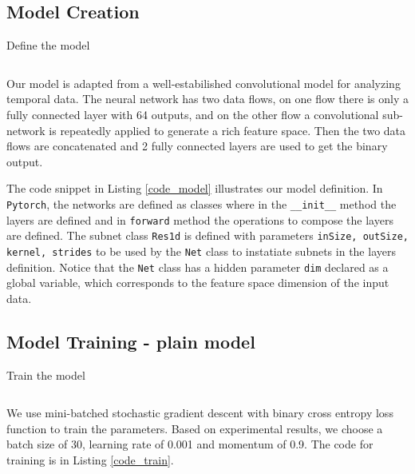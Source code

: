 \documentclass[a4paper,12pt]{article}
\newcommand{\torch}{\texttt{Pytorch}}
\begin{document}
\subsection{Model Creation}
\begin{listing}[H]
	\caption{Define the model}
	\inputminted[frame=single,framesep=10pt,linenos]{python3}{torch_model.py}
	\label{code_model}
\end{listing}
Our model is adapted from a well-estabilished convolutional model for analyzing temporal data. The neural network has two data flows, on one flow there is only a fully connected layer with 64 outputs, and on the other flow a convolutional sub-network is repeatedly applied to generate a rich feature space. Then the two data flows are concatenated and 2 fully connected layers are used to get the binary output.

The code snippet in Listing \ref{code_model} illustrates our model definition. In \torch, the networks are defined as classes where in the \texttt{\_\_init\_\_} method the layers are defined and in \texttt{forward} method the operations to compose the layers are defined. The subnet class \texttt{Res1d} is defined with parameters \texttt{inSize, outSize, kernel, strides} to be used by the \texttt{Net} class to instatiate subnets in the layers definition. Notice that the \texttt{Net} class has a hidden parameter \texttt{dim} declared as a global variable, which corresponds to the feature space dimension of the input data.

\subsection{Model Training - plain model}
\begin{listing}[H]
	\caption{Train the model}
	\inputminted[frame=single,framesep=10pt,linenos]{python3}{train.py}
	\label{code_train}
\end{listing}
We use mini-batched stochastic gradient descent with binary cross entropy loss function to train the parameters. Based on experimental results, we choose a batch size of 30, learning rate of 0.001 and momentum of 0.9. The code for training is in Listing \ref{code_train}.
\end{document}
